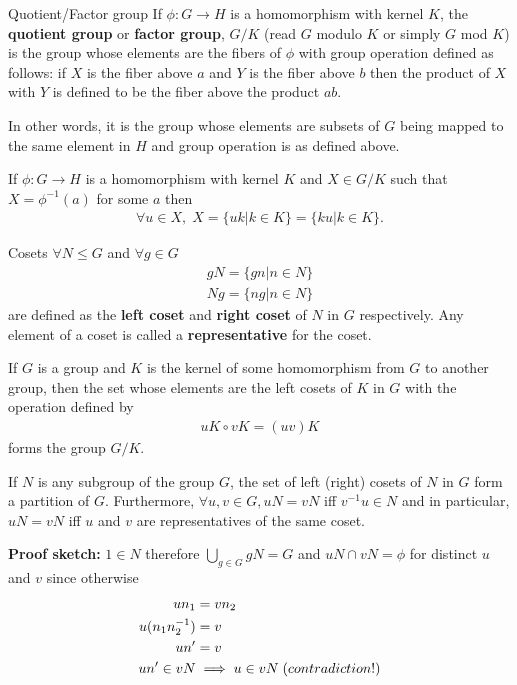 \documentclass[titlepage, 12pt]{article}
\begin{document}
\begin{definition}{Quotient/Factor group}{}
    If $\phi:G\rightarrow H$ is a homomorphism with kernel $K$, the
    \textbf{quotient group} or \textbf{factor group}, $G/K$ (read $G$ modulo $K$
    or simply $G$ mod $K$) is the group whose elements are the fibers of $\phi$
    with group operation defined as follows: if $X$ is the fiber above $a$ and
    $Y$ is the fiber above $b$ then the product of $X$ with $Y$ is defined to be
    the fiber above the product $ab$.
\end{definition}
In other words, it is the group whose elements are subsets of $G$ being mapped
to the same element in $H$ and group operation is as defined above.

\begin{proposition}{}{}
    If $\phi:G\rightarrow H$ is a homomorphism with kernel $K$ and $X\in G/K$
    such that $X = \phi^{-1}(a)$ for some $a$ then
    \begin{gather*}
        \forall u\in X,\;X = \{uk | k\in K\} = \{ku | k\in K\}.
    \end{gather*}
\end{proposition}
\begin{definition}{Cosets}{}
    $\forall N\le G$ and $\forall g\in G$
    \begin{gather*}
       gN = \{gn | n\in N\}\\
       Ng = \{ng | n\in N\}
    \end{gather*}
    are defined as the \textbf{left coset} and \textbf{right coset} of $N$ in
    $G$ respectively. Any element of a coset is called a \textbf{representative}
    for the coset.
\end{definition}
\begin{theorem}{}{}
    If $G$ is a group and $K$ is the kernel of some homomorphism from $G$ to
    another group, then the set whose elements are the left cosets of $K$ in $G$
    with the operation defined by
    \begin{gather*}
        uK\circ vK = (uv)K
    \end{gather*}
    forms the group $G/K$.
\end{theorem}
\begin{proposition}{}{}
    If $N$ is any subgroup of the group $G$, the set of left (right) cosets of $N$ in
    $G$ form a partition of $G$. Furthermore, $\forall u, v\in G, uN = vN$ iff
    $v^{-1}u\in N$ and in particular, $uN = vN$ iff $u$ and $v$ are
    representatives of the same coset.
\end{proposition}
\textbf{Proof sketch:} $1\in N$ therefore $\bigcup\limits_{g\in G} gN = G$ and
$uN\cap vN = \phi$ for distinct $u$ and $v$ since otherwise
\begin{align*}
    un_1 &= vn_2\\
    u(n_1n_2^{-1}) &= v\\
    un' &= v\\
    un'\in vN &\implies u\in vN\;\textrm(contradiction!)
\end{align*}
\end{document}
